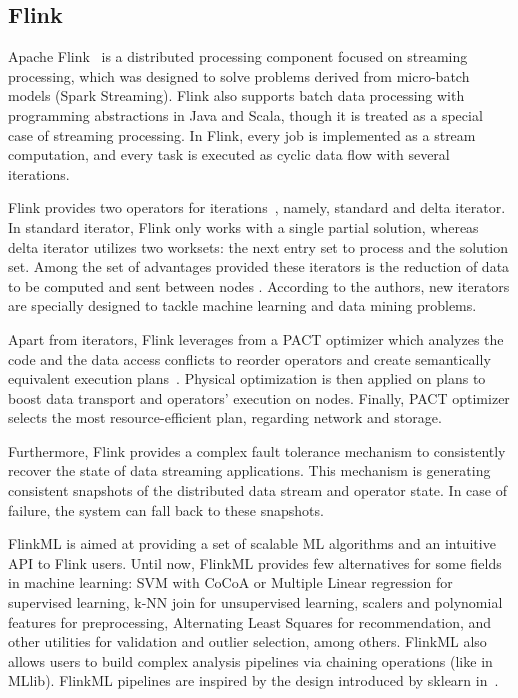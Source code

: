 \documentclass[3p,review]{elsarticle}
\begin{document}
\subsection{Flink}\label{subsec:flink}

Apache Flink~\cite{flink} is a distributed processing component focused on streaming processing, which was designed to solve problems derived from micro-batch models (Spark Streaming). Flink also supports batch data processing with programming abstractions in Java and Scala, though it is treated as a special case of streaming processing. In Flink, every job is implemented as a stream computation, and every task is executed as cyclic data flow with several iterations. 

Flink provides two operators for iterations~\cite{flinkengine}, namely, standard and delta iterator. In standard iterator, Flink only works with a single partial solution, whereas delta iterator utilizes two worksets: the next entry set to process and the solution set.
Among the set of advantages provided these iterators is the reduction of data to be computed and sent between nodes \cite{EwenTKM12}. According to the authors, new iterators are specially designed to tackle machine learning and data mining problems.

Apart from iterators, Flink leverages from a PACT optimizer which analyzes the code and the data access conflicts to reorder operators and create semantically equivalent execution plans~\cite{Alexandrov14,Hues12}. Physical optimization is then applied on plans to boost data transport and operators' execution on nodes. Finally, PACT optimizer selects the most resource-efficient plan, regarding network and storage.

Furthermore, Flink provides a complex fault tolerance mechanism to consistently recover the state of data streaming applications. This mechanism is generating consistent snapshots of the distributed data stream and operator state. In case of failure, the system can fall back to these snapshots.

FlinkML is aimed at providing a set of scalable ML algorithms and an intuitive API to Flink users. Until now, FlinkML provides few alternatives for some fields in machine learning: SVM with CoCoA or Multiple Linear regression for supervised learning, k-NN join for unsupervised learning, scalers and polynomial features for preprocessing, Alternating Least Squares for recommendation, and other utilities for validation and outlier selection, among others. FlinkML also allows users to build complex analysis pipelines via chaining operations (like in MLlib). FlinkML pipelines are inspired by the design introduced by sklearn in~\cite{buitin13}.
\end{document}
